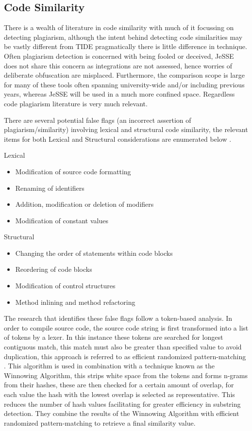 \documentclass[jou,apacite]{apa6}
\begin{document}
\subsection{Code Similarity}
There is a wealth of literature in code similarity with much of it focussing on detecting plagiarism, although the intent behind detecting code similarities may be vastly different from TIDE pragmatically there is little difference in technique. Often plagiarism detection is concerned with being fooled or deceived, JeSSE does not share this concern as integrations are not assessed,  hence worries of deliberate obfuscation are misplaced. Furthermore, the comparison scope is large for many of these tools often spanning university-wide and/or including previous years, whereas JeSSE will be used in a much more confined space. Regardless code plagiarism literature is very much relevant.

There are several potential false flags (an incorrect assertion of plagiarism/similarity) involving lexical and structural code similarity, the relevant items for both Lexical and Structural considerations are enumerated below \cite{Duric2013}.

Lexical
\begin{itemize}
  \setlength\itemsep{-0.5em}
  \item Modification of source code formatting 
  \item Renaming of identifiers
  \item Addition, modification or deletion of modifiers
  \item Modification of constant values
\end{itemize}

Structural
\begin{itemize}
  \setlength\itemsep{-0.5em}
  \item Changing the order of statements within code blocks
  \item Reordering of code blocks
  \item Modification of control structures
  \item Method inlining and method refactoring
\end{itemize}

The research that identifies these false flags follow a token-based analysis. In order to compile source code, the source code string is first transformed into a list of tokens by a lexer. In this instance these tokens are searched for longest contiguous match, this match must also be greater than specified value to avoid duplication, this approach is referred to as efficient randomized pattern-matching \cite{Rabin1987}. This algorithm is used in combination with a technique known as the Winnowing Algorithm, this strips white space from the tokens and forms n-grams from their hashes, these are then checked for a certain amount of overlap, for each value the hash with the lowest overlap is selected as representative. This reduces the number of hash values facilitating for greater efficiency in substring detection. They combine the results of the Winnowing Algorithm with efficient randomized pattern-matching to retrieve a final similarity value.
\end{document}
